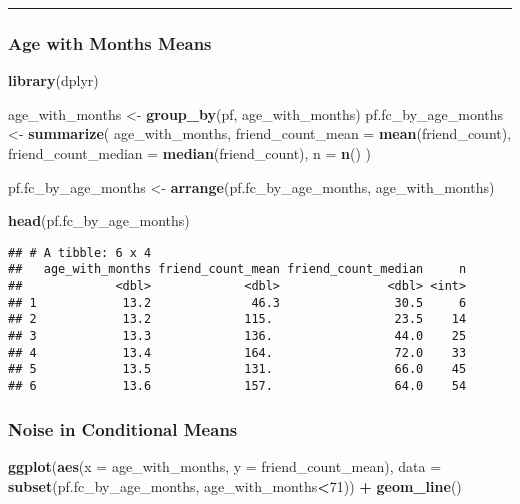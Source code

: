 \documentclass[]{article}
\newenvironment{Shaded}{\begin{snugshade}}{\end{snugshade}}
\newcommand{\KeywordTok}[1]{\textcolor[rgb]{0.13,0.29,0.53}{\textbf{#1}}}
\newcommand{\DataTypeTok}[1]{\textcolor[rgb]{0.13,0.29,0.53}{#1}}
\newcommand{\DecValTok}[1]{\textcolor[rgb]{0.00,0.00,0.81}{#1}}
\newcommand{\StringTok}[1]{\textcolor[rgb]{0.31,0.60,0.02}{#1}}
\newcommand{\OperatorTok}[1]{\textcolor[rgb]{0.81,0.36,0.00}{\textbf{#1}}}
\newcommand{\NormalTok}[1]{#1}
\begin{document}
\begin{center}\rule{0.5\linewidth}{\linethickness}\end{center}

\subsubsection{Age with Months Means}\label{age-with-months-means}

\begin{Shaded}
\begin{Highlighting}[]
\KeywordTok{library}\NormalTok{(dplyr)}

\NormalTok{age_with_months <-}\StringTok{ }\KeywordTok{group_by}\NormalTok{(pf, age_with_months)}
\NormalTok{pf.fc_by_age_months <-}\StringTok{ }\KeywordTok{summarize}\NormalTok{(}
\NormalTok{  age_with_months,}
  \DataTypeTok{friend_count_mean =} \KeywordTok{mean}\NormalTok{(friend_count),}
  \DataTypeTok{friend_count_median =} \KeywordTok{median}\NormalTok{(friend_count),}
  \DataTypeTok{n =} \KeywordTok{n}\NormalTok{()}
\NormalTok{)}

\NormalTok{pf.fc_by_age_months <-}\StringTok{ }\KeywordTok{arrange}\NormalTok{(pf.fc_by_age_months, age_with_months)}

\KeywordTok{head}\NormalTok{(pf.fc_by_age_months)}
\end{Highlighting}
\end{Shaded}

\begin{verbatim}
## # A tibble: 6 x 4
##   age_with_months friend_count_mean friend_count_median     n
##             <dbl>             <dbl>               <dbl> <int>
## 1            13.2              46.3                30.5     6
## 2            13.2             115.                 23.5    14
## 3            13.3             136.                 44.0    25
## 4            13.4             164.                 72.0    33
## 5            13.5             131.                 66.0    45
## 6            13.6             157.                 64.0    54
\end{verbatim}

\subsubsection{Noise in Conditional
Means}\label{noise-in-conditional-means}

\begin{Shaded}
\begin{Highlighting}[]
\KeywordTok{ggplot}\NormalTok{(}\KeywordTok{aes}\NormalTok{(}\DataTypeTok{x =}\NormalTok{ age_with_months, }\DataTypeTok{y =}\NormalTok{ friend_count_mean), }\DataTypeTok{data =} \KeywordTok{subset}\NormalTok{(pf.fc_by_age_months, age_with_months}\OperatorTok{<}\DecValTok{71}\NormalTok{)) }\OperatorTok{+}
\StringTok{  }\KeywordTok{geom_line}\NormalTok{()}
\end{Highlighting}
\end{Shaded}
\end{document}
